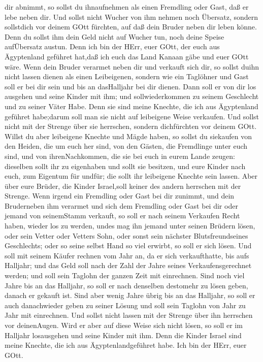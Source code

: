 dir abnimmt, so sollst du ihnaufnehmen als einen Fremdling oder Gast,
daß er lebe neben dir.  Und sollst nicht Wucher von ihm
nehmen noch Übersatz, sondern sollstdich vor deinem GOtt fürchten, auf
daß dein Bruder neben dir leben könne.  Denn du sollst ihm
dein Geld nicht auf Wucher tun, noch deine Speise aufÜbersatz austun.
 Denn ich bin der HErr, euer GOtt, der euch aus Ägyptenland
geführet hat,daß ich euch das Land Kanaan gäbe und euer GOtt wäre.
 Wenn dein Bruder verarmet neben dir und verkauft sich dir,
so sollst duihn nicht lassen dienen als einen Leibeigenen, 
sondern wie ein Taglöhner und Gast soll er bei dir sein und bis an
dasHalljahr bei dir dienen.  Dann soll er von dir los
ausgehen und seine Kinder mit ihm; und sollwiederkommen zu seinem
Geschlecht und zu seiner Väter Habe.  Denn sie sind meine
Knechte, die ich aus Ägyptenland geführet habe;darum soll man sie nicht
auf leibeigene Weise verkaufen.  Und sollst nicht mit der
Strenge über sie herrschen, sondern dichfürchten vor deinem GOtt.
 Willst du aber leibeigene Knechte und Mägde haben, so
sollst du siekaufen von den Heiden, die um euch her sind, 
von den Gästen, die Fremdlinge unter euch sind, und von ihrenNachkommen,
die sie bei euch in eurem Lande zeugen: dieselben sollt ihr zu
eigenhaben  und sollt sie besitzen, und eure Kinder nach
euch, zum Eigentum für undfür; die sollt ihr leibeigene Knechte sein
lassen. Aber über eure Brüder, die Kinder Israel,soll keiner des andern
herrschen mit der Strenge.  Wenn irgend ein Fremdling oder
Gast bei dir zunimmt, und dein Bruderneben ihm verarmet und sich dem
Fremdling oder Gast bei dir oder jemand von seinemStamm verkauft,
 so soll er nach seinem Verkaufen Recht haben, wieder los
zu werden, undes mag ihn jemand unter seinen Brüdern lösen,
 oder sein Vetter oder Vetters Sohn, oder sonst sein
nächster Blutsfreundseines Geschlechts; oder so seine selbst Hand so
viel erwirbt, so soll er sich lösen.  Und soll mit seinem
Käufer rechnen vom Jahr an, da er sich verkaufthatte, bis aufs Halljahr;
und das Geld soll nach der Zahl der Jahre seines Verkaufensgerechnet
werden; und soll sein Taglohn der ganzen Zeit mit einrechnen.
 Sind noch viel Jahre bis an das Halljahr, so soll er nach
denselben destomehr zu lösen geben, danach er gekauft ist. 
Sind aber wenig Jahre übrig bis an das Halljahr, so soll er auch
danachwieder geben zu seiner Lösung und soll sein Taglohn von Jahr zu
Jahr mit einrechnen.  Und sollst nicht lassen mit der
Strenge über ihn herrschen vor deinenAugen.  Wird er aber
auf diese Weise sich nicht lösen, so soll er im Halljahr losausgehen und
seine Kinder mit ihm.  Denn die Kinder Israel sind meine
Knechte, die ich aus Ägyptenlandgeführet habe. Ich bin der HErr, euer
GOtt.

